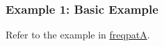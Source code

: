 \subsubsection*{Example 1: Basic Example}

Refer to the example in \hyperref[sect:freqpatA]{freqpatA}.

